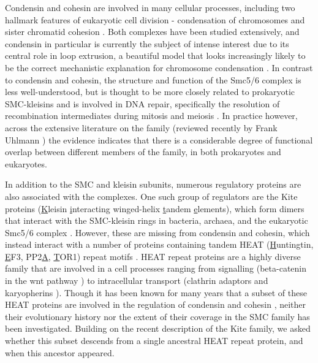 \documentclass[a4paper,11pt,twoside,openright]{scrbook}
\begin{document}
Condensin and cohesin are involved in many cellular processes, including two hallmark features of eukaryotic cell division - condensation of chromosomes and sister chromatid cohesion \cite{Wood2010}. Both complexes have been studied extensively, and condensin in particular is currently the subject of intense interest due to its central role in loop extrusion, a beautiful model that looks increasingly likely to be the correct mechanistic explanation for chromosome condensation \cite{Nasmyth2001a,Alipour2012,Goloborodko2016,Wang2017}. In contrast to condensin and cohesin, the structure and function of the Smc5/6 complex is less well-understood, but is thought to be more closely related to prokaryotic SMC-kleisins \cite{Palecek2015} and is involved in DNA repair, specifically the resolution of recombination intermediates during mitosis and meiosis \cite{Ampatzidou2006,Farmer2011}. In practice however, across the extensive literature on the family (reviewed recently by Frank Uhlmann \cite{Uhlmann2016}) the evidence indicates that there is a considerable degree of functional overlap between different members of the family, in both prokaryotes and eukaryotes.

In addition to the SMC and kleisin subunits, numerous regulatory proteins are also associated with the complexes. One such group of regulators are the Kite proteins (\underline{K}leisin \underline{i}nteracting winged-helix \underline{t}andem \underline{e}lements), which form dimers that interact with the SMC-kleisin rings in bacteria, archaea, and the eukaryotic Smc5/6 complex \cite{Palecek2015}. However, these are missing from condensin and cohesin, which instead interact with a number of proteins containing tandem HEAT (\underline{H}untingtin, \underline{E}F3, PP2\underline{A}, \underline{T}OR1) repeat motifs \cite{Andrade1995}. HEAT repeat proteins are a highly diverse family that are involved in a cell processes ranging from signalling (beta-catenin in the wnt pathway \cite{Morin1999}) to intracellular transport (clathrin adaptors \cite{McMahon2004} and karyopherins \cite{Chook2011}). Though it has been known for many years that a subset of these HEAT proteins are involved in the regulation of condensin and cohesin \cite{Neuwald2000}, neither their evolutionary history nor the extent of their coverage in the SMC family has been investigated. Building on the recent description of the Kite family, we asked whether this subset descends from a single ancestral HEAT repeat protein, and when this ancestor appeared.
\end{document}
